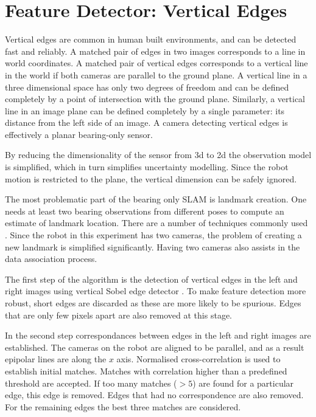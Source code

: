 \section{Feature Detector: Vertical Edges}

Vertical edges are common in human built environments, and can be
detected fast and reliably. A matched pair of edges in two images
corresponds to a line in world coordinates. A matched pair of vertical
edges corresponds to a vertical line in the world if both
cameras are parallel to the ground plane. A vertical line in a three
dimensional space has only two degrees of freedom and can be defined
completely by a point of intersection with the ground plane. Similarly,
a vertical line in an image plane can be defined completely by a
single parameter: its distance from the left side of an image. A
camera detecting vertical edges is effectively a planar bearing-only
sensor.

By reducing the dimensionality of the sensor from 3d to 2d the
observation model is simplified, which in turn simplifies uncertainty
modelling. Since the robot motion is restricted to the plane, the
vertical dimension can be safely ignored.

The most problematic part of the bearing only SLAM is landmark
creation. One needs at least two bearing observations from different
poses to compute an estimate of landmark location. There are a
number of techniques commonly used \cite{bearing_only_slam}. Since the
robot in this experiment has two cameras, the problem of creating a
new landmark is simplified significantly. Having two cameras also
assists in the data association process. 

The first step of the algorithm is the detection of vertical edges in
the left and right images using vertical Sobel edge detector
\cite{Hartley2004}. To make feature detection more robust, short edges
are discarded as these are more likely to be spurious. Edges that are
only few pixels apart are also removed at this stage.

In the second step correspondances between edges in the left and right
images are established. The cameras on the robot are aligned to be
parallel, and as a result epipolar lines are along the $x$
axis\cite{Hartley2004}. Normalised cross-correlation is used to
establish initial matches. Matches with correlation higher than a
predefined threshold are accepted. If too many matches ($>5$) are
found for a particular edge, this edge is removed. Edges that had no
correspondence are also removed. For the remaining edges the best
three matches are considered.


